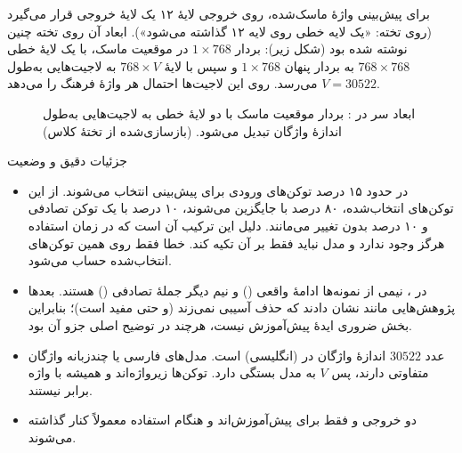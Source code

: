 برای پیش‌بینی واژهٔ ماسک‌شده، روی خروجی لایهٔ ۱۲ یک لایهٔ خروجی قرار می‌گیرد (روی تخته: «یک لایه خطی روی لایه ۱۲ گذاشته می‌شود»). ابعاد آن روی تخته چنین نوشته شده بود (شکل زیر): بردار $1\times768$ در موقعیت ماسک، با یک لایهٔ خطی $768\times768$ به بردار پنهان $1\times768$ و سپس با لایهٔ $768\times V$ به لاجیت‌هایی به‌طول \mbox{$V=30522$} می‌رسد.  روی این لاجیت‌ها احتمال هر واژهٔ فرهنگ را می‌دهد.

\begin{figure}[htbp]
\centering
{}
\caption{ابعاد سر  در : بردار موقعیت ماسک با دو لایهٔ خطی به لاجیت‌هایی به‌طول اندازهٔ واژگان تبدیل می‌شود. (بازسازی‌شده از تختهٔ کلاس)}
\end{figure}

\begin{correctionbox}{جزئیات دقیق  و وضعیت }
\begin{itemize}
  \item در  حدود ۱۵ درصد توکن‌های ورودی برای پیش‌بینی انتخاب می‌شوند. از این توکن‌های انتخاب‌شده، ۸۰ درصد با \lr{[MASK]} جایگزین می‌شوند، ۱۰ درصد با یک توکن تصادفی و ۱۰ درصد بدون تغییر می‌مانند. دلیل این ترکیب آن است که \lr{[MASK]} در زمان استفاده هرگز وجود ندارد و مدل نباید فقط بر آن تکیه کند. خطا فقط روی همین توکن‌های انتخاب‌شده حساب می‌شود.
  \item در ، نیمی از نمونه‌ها ادامهٔ واقعی () و نیم دیگر جملهٔ تصادفی () هستند. بعدها پژوهش‌هایی مانند  نشان دادند که حذف  آسیبی نمی‌زند (و حتی مفید است)؛ بنابراین  بخش ضروری ایدهٔ پیش‌آموزش نیست، هرچند در توضیح  اصلی جزو آن بود.
  \item عدد $30522$ اندازهٔ واژگان  در  (انگلیسی) است. مدل‌های فارسی یا چندزبانه واژگان متفاوتی دارند، پس $V$ به مدل بستگی دارد. توکن‌ها زیرواژه‌اند و همیشه با واژه برابر نیستند.
  \item دو خروجی  و  فقط برای پیش‌آموزش‌اند و هنگام استفاده معمولاً کنار گذاشته می‌شوند.
\end{itemize}
\end{correctionbox}

